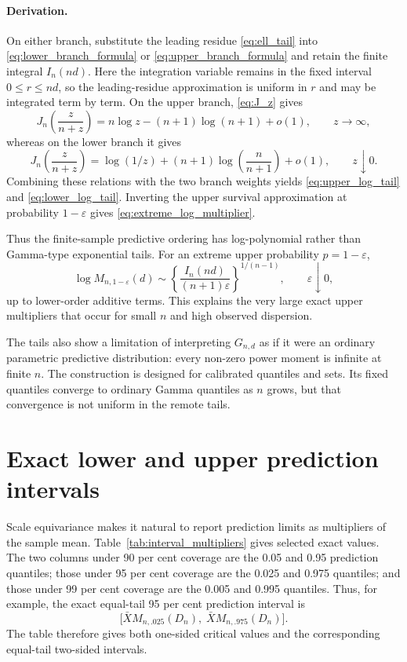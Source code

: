 \documentclass[11pt]{article}
\theoremstyle{remark}
\begin{document}
\paragraph{Derivation.}
On either branch, substitute the leading residue \eqref{eq:ell_tail} into \eqref{eq:lower_branch_formula} or \eqref{eq:upper_branch_formula} and retain the finite integral $I_n(nd)$. Here the integration variable remains in the fixed interval $0\le r\le nd$, so the leading-residue approximation is uniform in $r$ and may be integrated term by term. On the upper branch, \eqref{eq:J_z} gives
\[
 J_n\!\left(\frac{z}{n+z}\right)
 =n\log z-(n+1)\log(n+1)+o(1),
 \qquad z\to\infty,
\]
whereas on the lower branch it gives
\[
 J_n\!\left(\frac{z}{n+z}\right)
 =\log(1/z)+(n+1)\log\!\left(\frac{n}{n+1}\right)+o(1),
 \qquad z\downarrow0.
\]
Combining these relations with the two branch weights yields \eqref{eq:upper_log_tail} and \eqref{eq:lower_log_tail}. Inverting the upper survival approximation at probability $1-\varepsilon$ gives \eqref{eq:extreme_log_multiplier}.

Thus the finite-sample predictive ordering has log-polynomial rather than Gamma-type exponential tails. For an extreme upper probability $p=1-\varepsilon$,
\begin{equation}
 \log M_{n,1-\varepsilon}(d)
 \sim
 \left\{\frac{I_n(nd)}{(n+1)\varepsilon}\right\}^{1/(n-1)},
 \qquad \varepsilon\downarrow0,
 \label{eq:extreme_log_multiplier}
\end{equation}
up to lower-order additive terms. This explains the very large exact upper multipliers that occur for small $n$ and high observed dispersion.

The tails also show a limitation of interpreting $G_{n,d}$ as if it were an ordinary parametric predictive distribution: every non-zero power moment is infinite at finite $n$. The construction is designed for calibrated quantiles and sets. Its fixed quantiles converge to ordinary Gamma quantiles as $n$ grows, but that convergence is not uniform in the remote tails.

\section{Exact lower and upper prediction intervals}
\label{sec:tables}

Scale equivariance makes it natural to report prediction limits as multipliers of the sample mean. Table~\ref{tab:interval_multipliers} gives selected exact values. The two columns under 90 per cent coverage are the 0.05 and 0.95 prediction quantiles; those under 95 per cent coverage are the 0.025 and 0.975 quantiles; and those under 99 per cent coverage are the 0.005 and 0.995 quantiles. Thus, for example, the exact equal-tail 95 per cent prediction interval is
\[
 \big[\bar X M_{n,.025}(D_n),\;\bar X M_{n,.975}(D_n)\big].
\]
The table therefore gives both one-sided critical values and the corresponding equal-tail two-sided intervals.
\end{document}
